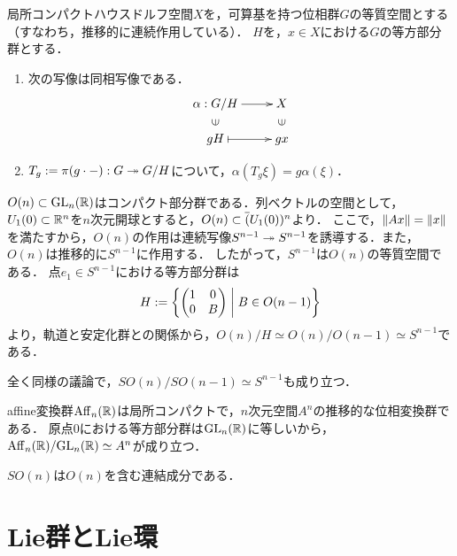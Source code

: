 \documentclass[uplatex,dvipdfmx]{jsreport}
\begin{document}
\begin{theorem}
    局所コンパクトハウスドルフ空間$X$を，可算基を持つ位相群$G$の等質空間とする（すなわち，推移的に連続作用している）．
    $H$を，$x\in X$における$G$の等方部分群とする．
    \begin{enumerate}
        \item 次の写像は同相写像である．
        \[\xymatrix@R-2pc{
            \alpha:G/H\ar[r]&X\\
            \rotatebox[origin=c]{90}{$\in$}&\rotatebox[origin=c]{90}{$\in$}\\
            gH\ar@{|->}[r]&gx
        }\]
        \item $T_g:=\pi(g\cdot -):G\twoheadrightarrow G/H$について，$\alpha(T_g\xi)=g\alpha(\xi)$．
    \end{enumerate}
\end{theorem}
\begin{example}[直交群の等質空間としての単位球面]
    $O(n)\subset\mathrm{GL}_n(\mathbb{R})$はコンパクト部分群である．列ベクトルの空間として，$U_1(0)\subset\mathbb{R}^n$を$n$次元開球とすると，$O(n)\subset\overline{(}U_1(0))^n$より．
    ここで，$\|Ax\|=\|x\|$を満たすから，$O(n)$の作用は連続写像$S^{n-1}\twoheadrightarrow S^{n-1}$を誘導する．また，$O(n)$は推移的に$S^{n-1}$に作用する．
    したがって，$S^{n-1}$は$O(n)$の等質空間である．
    点$e_1\in S^{n-1}$における等方部分群は
    \[H:=\left\{\begin{pmatrix}1&0\\0&B\end{pmatrix}\;\middle|\;B\in O(n-1)\right\}\]
    より，軌道と安定化群との関係から，$O(n)/H\simeq O(n)/O(n-1)\simeq S^{n-1}$である．

    全く同様の議論で，$SO(n)/SO(n-1)\simeq S^{n-1}$も成り立つ．
\end{example}
\begin{example}[affine空間]
    affine変換群$\mathrm{Aff}_n(\mathbb{R})$は局所コンパクトで，$n$次元空間$A^n$の推移的な位相変換群である．
    原点$0$における等方部分群は$\mathrm{GL}_n(\mathbb{R})$に等しいから，$\mathrm{Aff}_n(\mathbb{R})/\mathrm{GL}_n(\mathbb{R})\simeq A^n$が成り立つ．
\end{example}

\begin{proposition}
    $SO(n)$は$O(n)$を含む連結成分である．
\end{proposition}

\section{Lie群とLie環}
\end{document}
